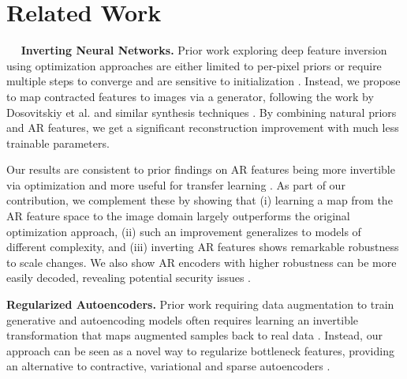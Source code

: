 \section{Related Work}
\label{sec:related}

$\quad$
\textbf{Inverting Neural Networks.}
Prior work exploring deep feature inversion using optimization approaches are either limited to per-pixel priors or require multiple steps to converge and are sensitive to initialization \cite{mahendran_2015_understanding,mahendran_2016_visualizing,engstrom_2019_adversarial,santurkar_2019_image}. Instead, we propose to map contracted features to images via a generator, following the work by Dosovitskiy et al. \cite{dosovitskiy_2016_generating} and similar synthesis techniques \cite{shocher_2020_semantic,nguyen2017plug,nguyen2016synthesizing}. By combining natural priors and AR features, we get a significant reconstruction improvement with much less trainable parameters.

Our results are consistent to prior findings on AR features being more invertible via optimization \cite{engstrom_2019_adversarial} and more useful for transfer learning \cite{salman_2020_adversarially}. As part of our contribution, we complement these by showing that (i) learning a map from the AR feature space to the image domain largely outperforms the original optimization approach, (ii) such an improvement generalizes to models of different complexity, and (iii) inverting AR features shows remarkable robustness to scale changes. We also show AR encoders with higher robustness can be more easily decoded, revealing potential security issues \cite{zhang2020secret}.

\textbf{Regularized Autoencoders.}
Prior work requiring data augmentation to train generative and autoencoding models often requires learning an invertible transformation  that maps augmented samples back to real data \cite{jun2020distribution}. Instead, our approach can be seen as a novel way to regularize bottleneck features, providing an alternative to contractive, variational and sparse autoencoders \cite{goodfellow2016deep,kingma_2013_auto,ng2011sparse}.
